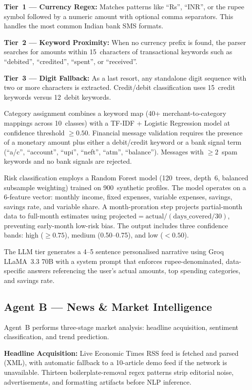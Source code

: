 \documentclass[conference]{IEEEtran}
\begin{document}
\textbf{Tier~1 --- Currency Regex:} Matches patterns like ``Rs'', ``INR'', or the rupee symbol followed by a numeric amount with optional comma separators. This handles the most common Indian bank SMS formats.

\textbf{Tier~2 --- Keyword Proximity:} When no currency prefix is found, the parser searches for amounts within 15~characters of transactional keywords such as ``debited'', ``credited'', ``spent'', or ``received''.

\textbf{Tier~3 --- Digit Fallback:} As a last resort, any standalone digit sequence with two or more characters is extracted. Credit/debit classification uses 15~credit keywords versus 12~debit keywords.

Category assignment combines a keyword map (40+ merchant-to-category mappings across 10~classes) with a TF-IDF + Logistic Regression model at confidence threshold $\geq 0.50$. Financial message validation requires the presence of a monetary amount plus either a debit/credit keyword or a bank signal term (``a/c'', ``account'', ``upi'', ``neft'', ``atm'', ``balance''). Messages with $\geq 2$~spam keywords and no bank signals are rejected.

Risk classification employs a Random Forest model (120~trees, depth~6, balanced subsample weighting) trained on 900~synthetic profiles. The model operates on a 6-feature vector: monthly income, fixed expenses, variable expenses, savings, savings rate, and variable share. A month-proration step projects partial-month data to full-month estimates using $\text{projected} = \text{actual} / (\text{days\_covered} / 30)$, preventing early-month low-risk bias. The output includes three confidence bands: high ($\geq 0.75$), medium (0.50--0.75), and low ($< 0.50$).

The LLM tier generates a 4--5 sentence personalised narrative using Groq LLaMA~3.3 70B with a system prompt that enforces rupee-denominated, data-specific answers referencing the user's actual amounts, top spending categories, and savings rate.

\subsection{Agent B --- News \& Market Intelligence}

Agent~B performs three-stage market analysis: headline acquisition, sentiment classification, and trend prediction.

\textbf{Headline Acquisition:} Live Economic Times RSS feed is fetched and parsed (XML), with automatic fallback to a 10-article demo feed if the network is unavailable. Thirteen boilerplate-removal regex patterns strip editorial noise, advertisements, and formatting artifacts before NLP inference.
\end{document}
